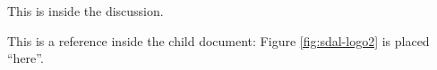 \documentclass[../../master.tex]{subfiles}
\begin{document}
This is inside the discussion.

This is a reference inside the child document:
Figure \ref{fig:sdal-logo2} is placed ``here''.
\end{document}
